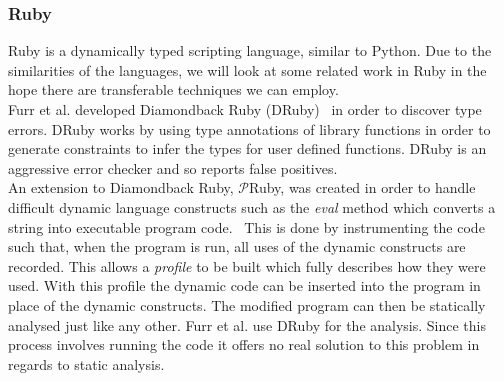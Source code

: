 \documentclass[12pt, titlepage]{article}
\begin{document}
\subsubsection{Ruby}
Ruby is a dynamically typed scripting language, similar to Python. Due to the similarities of the languages, we will look at some related work in Ruby in the hope there are transferable techniques we can employ. \\
\indent Furr et al. developed Diamondback Ruby (DRuby)~\cite{furr09} in order to discover type errors. DRuby works by using type annotations of library functions in order to generate constraints to infer the types for user defined functions. DRuby is an aggressive error checker and so reports false positives. \\
\indent An extension to Diamondback Ruby, $\mathcal{P}$Ruby, was created in order to handle difficult dynamic language constructs such as the \textit{eval} method which converts a string into executable program code.~\cite{pRuby} This is done by instrumenting the code such that, when the program is run, all uses of the dynamic constructs are recorded. This allows a \textit{profile} to be built which fully describes how they were used. With this profile the dynamic code can be inserted into the program in place of the dynamic constructs. The modified program can then be statically analysed just like any other. Furr et al. use DRuby for the analysis. Since this process involves running the code it offers no real solution to this problem in regards to static analysis.





\newpage
\end{document}
